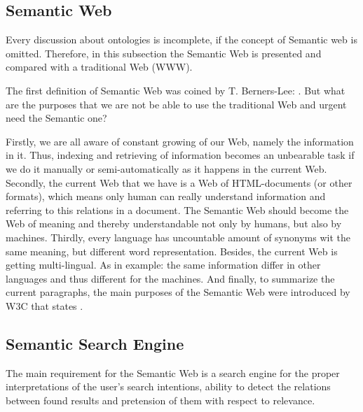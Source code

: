 		\subsection{Semantic Web}
		Every discussion about ontologies is incomplete, if the concept of Semantic web is omitted. Therefore, in this subsection the Semantic Web is presented and compared with a traditional Web (WWW).
		
		The first definition of Semantic Web was coined by T. Berners-Lee: \frqq\cite{Ber01}. But what are the purposes that we are not be able to use the traditional Web and urgent need the Semantic one? 
		
		Firstly, we are all aware of constant growing of our Web, namely the information in it. Thus, indexing and retrieving of information becomes an unbearable task if we do it manually or semi-automatically as it happens in the current Web. Secondly, the current Web that we have is a Web of HTML-documents (or other formats), which means only human can really understand information and referring to this relations in a document. The Semantic Web should become the Web of meaning and thereby understandable not only by humans, but also by machines. Thirdly, every language has uncountable amount of synonyms wit the same meaning, but different word representation. Besides, the current Web is getting multi-lingual. As in example: \frqq \cite[p. 40 ]{Raj14} the same information differ in other languages and thus different for the machines. And finally, to summarize the current paragraphs, the main purposes of the Semantic Web were introduced by W3C that states \frqq\cite{w3c01}.
		
		
		\subsection{Semantic Search Engine}
		The main requirement for the Semantic Web is a search engine for the proper interpretations of the user's search intentions, ability to detect the relations between found results and pretension of them with respect to relevance.
		
